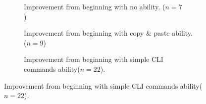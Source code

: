 \documentclass[10pt, twocolumn]{article}
\begin{document}
\begin{figure}[t]
\centering
\begin{subfigure}[c]{2.1in}
	\centering
    	\caption{
    	Improvement from beginning with no ability. ($n=7$)~~~~~~~~~~~~~~~~~~~~~~~~~~
    	    	\label{shellDetailSkill1}}

    \end{subfigure}
    \begin{subfigure}[c]{2.1in}
        \centering
    	\caption{
    	Improvement from beginning with copy \& paste ability. ($n=9$)~~~~~~~~~~~~~~~~~~~~~~~~
    		\label{shellDetailSkill2}}
    
    \end{subfigure}
    \begin{subfigure}[c]{2.1in}
    	\centering
    	\caption{
    	Improvement from beginning with simple CLI commands ability($n=22$).
    	\label{shellDetailSkill3}}
    	

\end{subfigure}
\end{figure}
\end{document}
